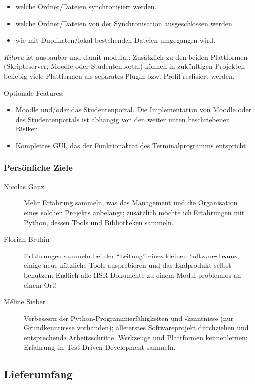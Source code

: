 \documentclass[a4paper]{article}
\begin{document}
\begin{itemize}
  \item welche Ordner/Dateien synchronisiert werden.
  \item welche Ordner/Dateien von der Synchronisation ausgeschlossen werden.
  \item wie mit Duplikaten/lokal bestehenden Dateien umgegangen wird.
\end{itemize}

\emph{Kitovu} ist ausbaubar und damit modular: Zusätzlich zu den beiden Plattformen (Skripteserver; Moodle oder Studentenportal) können in zukünftigen Projekten beliebig viele Plattformen als separates Plugin bzw. Profil realisiert werden.

Optionale Features:

\begin{itemize}
  \item Moodle und/oder das Studentenportal. Die Implementation von Moodle oder des Studentenportals ist abhängig von den weiter unten beschriebenen Risiken.
  \item Komplettes GUI, das der Funktionalität des Terminalprogramms entspricht.
\end{itemize}
\pagebreak
\subsubsection{Persönliche Ziele}
\begin{description}
\item[Nicolas Ganz] 
  Mehr Erfahrung sammeln, was das Management und die Organisation eines solchen Projekts anbelangt; zusätzlich möchte ich Erfahrungen mit Python, dessen Tools und Bibliotheken sammeln.
\item[Florian Bruhin] Erfahrungen sammeln bei der ``Leitung'' eines kleinen
  Software-Teams, einige neue nützliche Tools ausprobieren und das Endprodukt selbst benutzen: Endlich alle HSR-Dokumente zu einem Modul problemlos an einem Ort!
\item[Méline Sieber] Verbessern der Python-Programmierfähigkeiten und -kenntnisse (nur Grundkenntnisse vorhanden); allererstes Softwareprojekt durchziehen und entsprechende Arbeitsschritte, Werkzeuge und Plattformen kennenlernen; Erfahrung im Test-Driven-Development sammeln.
\end{description}

\subsection{Lieferumfang}
\end{document}
